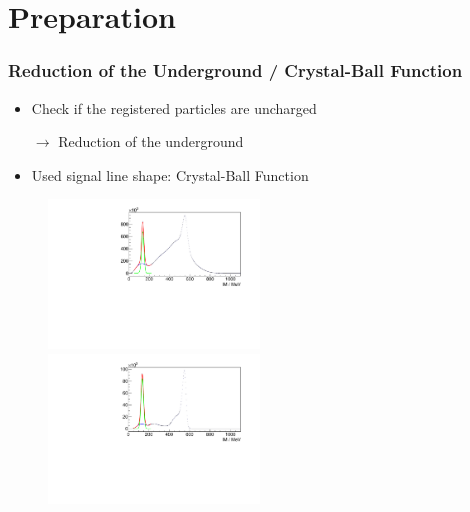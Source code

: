 \documentclass[slidestop,compress,mathserif]{beamer}
\begin{document}
\section{Preparation}
\begin{frame}
	\frametitle{Reduction of the Underground / Crystal-Ball Function}
	\begin{itemize}
		
	
		\item Check if the registered particles are uncharged 
		
		$\rightarrow$ Reduction of the underground
		\item Used signal line shape: Crystal-Ball Function
	\end{itemize}


\begin{figure}
	
		\includegraphics[width=0.50\textwidth]{Pictures/20171904RealIntervalFitExample}
	\hfill
		\includegraphics[width=0.50\textwidth]{Pictures/20171904RealUnchargedFitExample}
		
\end{figure}

\end{frame}
\end{document}
